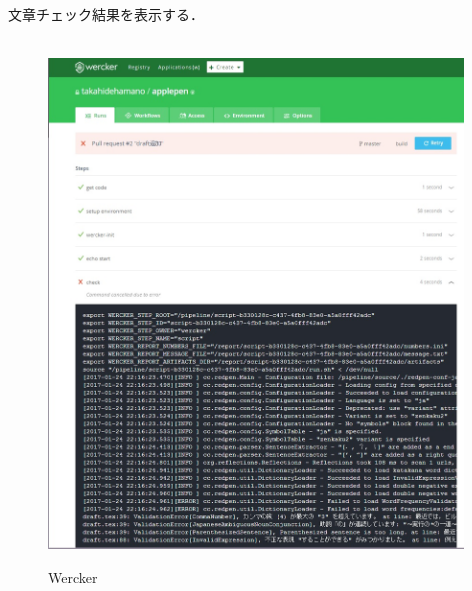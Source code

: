 \newpage
文章チェック結果を表示する．
\begin{figure}
\centering　
\includegraphics[width=11cm]{25.JPG}
\caption{Wercker}\label{tab:uac}
\end{figure}
